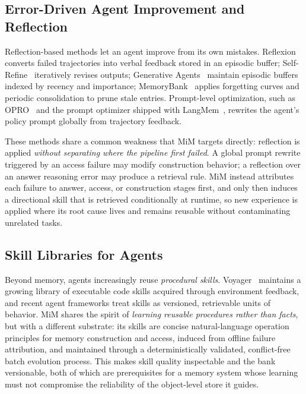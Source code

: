 \documentclass[11pt]{article}
\begin{document}
\subsection{Error-Driven Agent Improvement and Reflection}
\label{sec:rw-reflect}

Reflection-based methods let an agent improve from its own mistakes.
Reflexion~\cite{shinn2023reflexion} converts failed trajectories into verbal
feedback stored in an episodic buffer; Self-Refine~\cite{madaan2023selfrefine}
iteratively revises outputs; Generative Agents~\cite{park2023generative}
maintain episodic buffers indexed by recency and importance; MemoryBank~\cite{zhong2024memorybank}
applies forgetting curves and periodic consolidation to prune stale entries.
Prompt-level optimization, such as OPRO~\cite{yang2024opro} and the prompt
optimizer shipped with LangMem~\cite{langmem2025}, rewrites the agent's policy
prompt globally from trajectory feedback.

These methods share a common weakness that MiM targets directly: reflection is
applied \emph{without separating where the pipeline first failed}. A global
prompt rewrite triggered by an access failure may modify construction behavior;
a reflection over an answer reasoning error may produce a retrieval rule. MiM
instead attributes each failure to answer, access, or construction stages first,
and only then induces a directional skill that is retrieved conditionally at
runtime, so new experience is applied where its root cause lives and remains
reusable without contaminating unrelated tasks.

\subsection{Skill Libraries for Agents}
\label{sec:rw-skill}

Beyond memory, agents increasingly reuse \emph{procedural skills}. Voyager~\cite{wang2023voyager}
maintains a growing library of executable code skills acquired through
environment feedback, and recent agent frameworks treat skills as versioned,
retrievable units of behavior. MiM shares the spirit of \emph{learning reusable
procedures rather than facts}, but with a different substrate: its skills are
concise natural-language operation principles for memory construction and
access, induced from offline failure attribution, and maintained through a
deterministically validated, conflict-free batch evolution process. This makes
skill quality inspectable and the bank versionable, both of which are
prerequisites for a memory system whose learning must not compromise the
reliability of the object-level store it guides.
\end{document}
